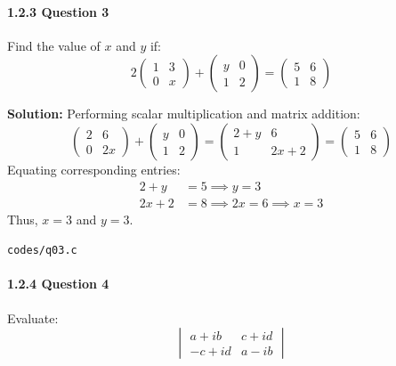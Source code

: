 \documentclass{article}
\begin{document}
\paragraph{1.2.3 Question 3}
Find the value of $x$ and $y$ if:
\begin{equation}
2\begin{pmatrix} 1 & 3 \\ 0 & x \end{pmatrix} + \begin{pmatrix} y & 0 \\ 1 & 2 \end{pmatrix} = \begin{pmatrix} 5 & 6 \\ 1 & 8 \end{pmatrix}
\end{equation}

\textbf{Solution:} Performing scalar multiplication and matrix addition:
\begin{equation}
\begin{pmatrix} 2 & 6 \\ 0 & 2x \end{pmatrix} + \begin{pmatrix} y & 0 \\ 1 & 2 \end{pmatrix} = \begin{pmatrix} 2+y & 6 \\ 1 & 2x+2 \end{pmatrix} = \begin{pmatrix} 5 & 6 \\ 1 & 8 \end{pmatrix}
\end{equation}
Equating corresponding entries:
\begin{align}
2 + y &= 5 \implies y = 3 \\
2x + 2 &= 8 \implies 2x = 6 \implies x = 3
\end{align}
Thus, $x = 3$ and $y = 3$.
\begin{tcolorbox}[colback=gray!10,colframe=black,width=\linewidth]
\texttt{codes/q03.c}
\end{tcolorbox}

\paragraph{1.2.4 Question 4}
Evaluate:
\begin{equation}
\begin{vmatrix} a + ib & c + id \\ -c + id & a - ib \end{vmatrix}
\end{equation}
\end{document}
